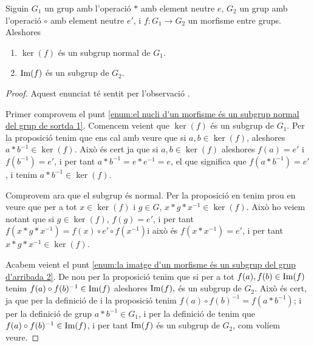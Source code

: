 \documentclass[../Apunts.tex]{subfiles}
\begin{document}
	\begin{proposition}
		\label{prop:el nucli d'un morfisme és un subgrup normal del grup de sortda}
		\label{prop:la imatge d'un morfisme és un subgrup del grup d'arribada}
			Siguin \(G_{1}\) un grup amb l'operació \(\ast\) amb element neutre \(e\), \(G_{2}\) un grup amb l'operació \(\circ\) amb element neutre \(e'\), i \(f\colon G_{1}\to G_{2}\) un morfisme entre grups. Aleshores
		\begin{enumerate}
			\item\label{enum:el nucli d'un morfisme és un subgrup normal del grup de sortda 1} \(\ker(f)\) és un subgrup normal de \(G_{1}\).
			\item\label{enum:la imatge d'un morfisme és un subgrup del grup d'arribada 2} \(\operatorname*{Im}(f)\) és un subgrup de \(G_{2}\).
		\end{enumerate}
		\begin{proof}
			Aquest enunciat té sentit per l'observació .
			
			Primer comprovem el punt \eqref{enum:el nucli d'un morfisme és un subgrup normal del grup de sortda 1}. Comencem veient que \(\ker(f)\) és un subgrup de \(G_{1}\). Per la proposició  tenim que ens cal amb veure que si \(a,b\in\ker(f)\), aleshores \(a\ast b^{-1}\in\ker(f)\). Això és cert ja que si \(a,b\in\ker(f)\) aleshores \(f(a)=e'\) i \(f(b^{-1})=e'\), i per tant \(a\ast b^{-1}=e\ast e^{-1}=e\), el que significa que \(f(a\ast b^{-1})=e'\), i tenim \(a\ast b^{-1}\in\ker(f)\).
			
			Comprovem ara que el subgrup és normal. Per la proposició  en tenim prou en veure que per a tot \(x\in\ker(f)\) i \(g\in G\), \(x\ast g\ast x^{-1}\in\ker(f)\). Això ho veiem notant que si \(g\in\ker(f)\), \(f(g)=e'\), i per tant \(f(x\ast g\ast x^{-1})=f(x)\circ e'\circ f(x^{-1})\)i això és \(f(x\ast x^{-1})=e'\), i per tant \(x\ast g\ast x^{-1}\in\ker(f)\).
			
			Acabem veient el punt \eqref{enum:la imatge d'un morfisme és un subgrup del grup d'arribada 2}. De nou per la proposició  tenim que si per a tot \(f(a),f(b)\in\operatorname*{Im}(f)\) tenim \(f(a)\circ f(b)^{-1}\in\operatorname*{Im}(f)\) aleshores \(\operatorname*{Im}(f),\) és un subgrup de \(G_{2}\). Això és cert, ja que per la definició de  i la proposició  tenim \(f(a)\circ f(b)^{-1}=f(a\ast b^{-1})\); i per la definició de grup \(a\ast b^{-1}\in G_{1}\), i per la definició de  tenim que \(f(a)\circ f(b)^{-1}\in\operatorname*{Im}(f)\), i per tant \(\operatorname*{Im}(f)\) és un subgrup de \(G_{2}\), com volíem veure.
		\end{proof}
	\end{proposition}
\end{document}
